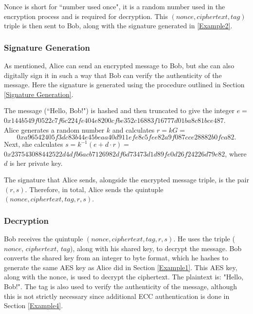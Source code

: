 \documentclass[12pt,a4paper]{article}
\begin{document}
\vspace{1mm}

Nonce is short for ``number used once", it is a random number used in the encryption process and is required for decryption. 
This $(nonce, ciphertext, tag)$ triple is then sent to Bob, along with the signature generated in \ref{Example2}. 


\subsubsection{Signature Generation} \noindent \label{Example2}
As mentioned, Alice can send an encrypted message to Bob, 
but she can also digitally sign it in such a way that Bob can verify the authenticity of the message. 
Here the signature is generated using the procedure outlined in Section \ref{Signature Generation}. 

The message (``Hello, Bob!") is hashed and then truncated to give the integer $e =$ \\
{\footnotesize $0x144b549f0522c7f6c224fe404e8200cfbe352c16883f16777d01ba8c81bce487$}. \\
Alice generates a random number $k$ and calculates $r = kG =$ 
\begin{equation} \label{AliceSig}
    0xa96542405f3dc83b44e45beaa40d911efe8c5fee82a9f087cce28882b0fca82.
\end{equation}
Next, she calculates $s = k^{-1}(e + d \cdot r) =$ \\
{\footnotesize $0x237543088442522d4dfb6acb7126982df6d73473d1d89fe0d26f24226d79e82$}, where $d$ is her private key. 

The signature that Alice sends, alongside the encrypted message triple, is the pair $(r,s)$. 
Therefore, in total, Alice sends the quintuple $(nonce, ciphertext, tag, r, s)$. 


\subsubsection{Decryption} \noindent \label{Example3}
Bob receives the quintuple $(nonce, ciphertext, tag, r, s)$. 
He uses the triple ($nonce$, $ciphertext$, $tag$), along with his shared key, to decrypt the message. 
Bob converts the shared key from an integer to byte format, which he hashes to generate the same AES key as Alice did in Section \ref{Example1}. 
This AES key, along with the nonce, is used to decrypt the ciphertext. 
The plaintext is: "Hello, Bob!". 
The tag is also used to verify the authenticity of the message, 
although this is not strictly necessary since additional ECC authentication is done in Section \ref{Example4}. 
\end{document}
